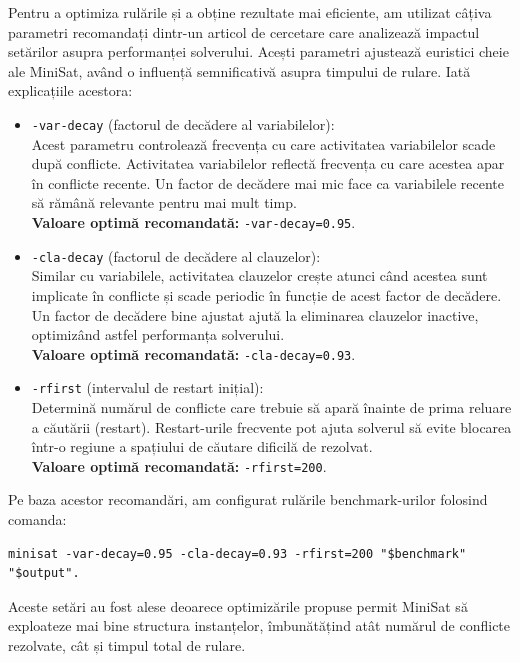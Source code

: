 \documentclass[runningheads]{llncs}
\begin{document}
Pentru a optimiza rulările și a obține rezultate mai eficiente, am utilizat câțiva parametri recomandați dintr-un articol de cercetare \cite{beskydsurynek2023parameter} care analizează impactul setărilor asupra performanței solverului. Acești parametri ajustează euristici cheie ale MiniSat, având o influență semnificativă asupra timpului de rulare. Iată explicațiile acestora:
\begin{itemize}
    \item \texttt{-var-decay} (factorul de decădere al variabilelor):\\
    Acest parametru controlează frecvența cu care activitatea variabilelor scade după conflicte. Activitatea variabilelor reflectă frecvența cu care acestea apar în conflicte recente. Un factor de decădere mai mic face ca variabilele recente să rămână relevante pentru mai mult timp.\\
    \textbf{Valoare optimă recomandată:} \texttt{-var-decay=0.95}.
    
    \item \texttt{-cla-decay} (factorul de decădere al clauzelor):\\
    Similar cu variabilele, activitatea clauzelor crește atunci când acestea sunt implicate în conflicte și scade periodic în funcție de acest factor de decădere. Un factor de decădere bine ajustat ajută la eliminarea clauzelor inactive, optimizând astfel performanța solverului.\\
    \textbf{Valoare optimă recomandată:} \texttt{-cla-decay=0.93}.
    
    \item \texttt{-rfirst} (intervalul de restart inițial):\\
    Determină numărul de conflicte care trebuie să apară înainte de prima reluare a căutării (restart). Restart-urile frecvente pot ajuta solverul să evite blocarea într-o regiune a spațiului de căutare dificilă de rezolvat.\\
    \textbf{Valoare optimă recomandată:} \texttt{-rfirst=200}.
\end{itemize}

Pe baza acestor recomandări, am configurat rulările benchmark-urilor folosind comanda:
\begin{verbatim}
minisat -var-decay=0.95 -cla-decay=0.93 -rfirst=200 "$benchmark" "$output".
\end{verbatim}

Aceste setări au fost alese deoarece optimizările propuse permit MiniSat să exploateze mai bine structura instanțelor, îmbunătățind atât numărul de conflicte rezolvate, cât și timpul total de rulare.
\end{document}
